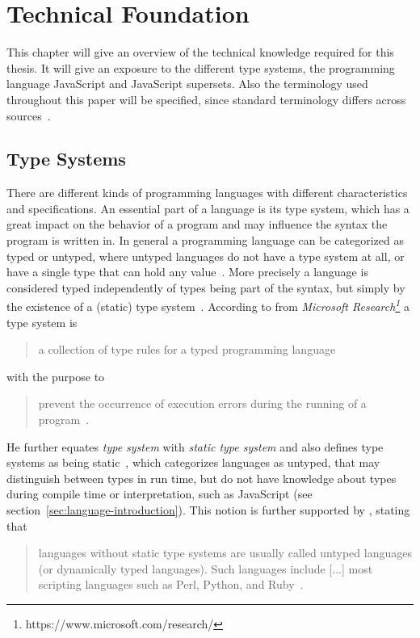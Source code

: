 \chapter{Technical Foundation}
\label{cha:technical-foundation}

This chapter will give an overview of the technical knowledge required for this thesis. It will give an exposure to the different type systems, the programming language JavaScript and JavaScript supersets. Also the terminology used throughout this paper will be specified, since standard terminology differs across sources~\cite[p.~1]{TypeSystems:Cardelli:2004}.

\section{Type Systems}
\label{sec:type-systems}

There are different kinds of programming languages with different characteristics and specifications. An essential part of a language is its type system, which has a great impact on the behavior of a program and may influence the syntax the program is written in.
In general a programming language can be categorized as typed or untyped, where untyped languages do not have a type system at all, or have a single type that can hold any value~\cite[p.~2]{TypeSystems:Cardelli:2004}. More precisely a language is considered typed independently of types being part of the syntax, but simply by the existence of a (static) type system~\cite[p.~2]{TypeSystems:Cardelli:2004}.
According to \citeauthor{TypeSystems:Cardelli:2004} from \emph{Microsoft Research\footnote{https://www.microsoft.com/research/}} a type system is
\begin{quote}
  a collection of type rules for a typed programming language~\cite[p.~1]{TypeSystems:Cardelli:2004}
\end{quote}
with the purpose to
\begin{quote}
  prevent the occurrence of execution errors during the running of a program~\cite[p.~1]{TypeSystems:Cardelli:2004}.
\end{quote}
He further equates \emph{type system} with \emph{static type system} and also \citeauthor{TypesAndProgrammingLanguages:Pierce:2002} defines type systems as being static~\cite[p.~2]{TypesAndProgrammingLanguages:Pierce:2002}, which categorizes languages as untyped, that may distinguish between types in run time, but do not have knowledge about types during compile time or interpretation, such as JavaScript (see section~\ref{sec:language-introduction}). This notion is further supported by \citeauthor{ProgrammingLanguagesPrinciplesAndPractices:LoudenLambert:2011}, stating that
\begin{quote}
  languages without static type systems are usually called untyped languages (or dynamically typed languages). Such languages include [...] most scripting languages such as Perl, Python, and Ruby~\cite[p.~331]{ProgrammingLanguagesPrinciplesAndPractices:LoudenLambert:2011}.
\end{quote}

